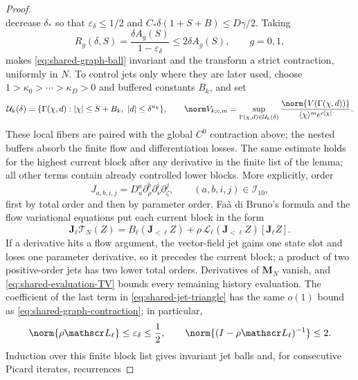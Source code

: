 \begin{proof}
\[\]
decrease \(\delta_*\) so that \(\varepsilon_\delta\le1/2\) and
\(C_*\delta(1+S+B)\le D\gamma/2\).  Taking
\begin{equation}
 R_g(\delta,S)=\frac{\delta A_g(S)}{1-\varepsilon_\delta}
               \le2\delta A_g(S),\qquad g=0,1,       \label{eq:shared-graph-radii}
\end{equation}
makes \cref{eq:shared-graph-ball} invariant and the transform a strict
contraction, uniformly in \(N\).
To control jets only where they are later used, choose
\(1>\kappa_0>\cdots>\kappa_D>0\) and buffered constants \(B_k\), and set
\[
 \mathcal U_k(\delta)
 =\{\Gamma(\chi,d):|\chi|\le S+B_k,\ |d|\le\delta^{\kappa_k}\},
 \qquad
 \norm V_{k;c,m}
 =\sup_{\Gamma(\chi,d)\in\mathcal U_k(\delta)}
   \frac{\norm{V(\Gamma(\chi,d))}}
        {\langle\chi\rangle^m e^{c|\chi|}}.
\]
These local fibers are paired with the global \(C^0\) contraction above;
the nested buffers absorb the finite flow and differentiation losses.
The same estimate holds for the highest current block after any derivative
in the finite list of the lemma; all other terms contain already controlled
lower blocks.  More explicitly, order
\[
 J_{a,b,i,j}=D_u^a\partial_\rho^b\partial_\nu^i
                 \partial_\zeta^j,
 \qquad (a,b,i,j)\in\mathcal I_{10},
\]
first by total order and then by parameter order.  Fa\`a di Bruno's formula
and the flow variational equations put each current block in the form
\begin{equation}
 \mathbf J_\ell\mathcal T_N(Z)
 =B_\ell(\mathbf J_{<\ell}Z)
 +\rho\,\mathscr L_\ell(\mathbf J_{<\ell}Z)
          [\mathbf J_\ell Z].                        \label{eq:shared-jet-triangle}
\end{equation}
If a derivative hits a flow argument, the vector-field jet gains one state
slot and loses one parameter derivative, so it precedes the current block;
a product of two positive-order jets has two lower total orders.  Derivatives
of \(\mathbf M_N\) vanish, and
\cref{eq:shared-evaluation-TV} bounds every remaining history evaluation.
The coefficient of the last term in
\cref{eq:shared-jet-triangle} has the same \(o(1)\) bound as
\cref{eq:shared-graph-contraction}; in particular,
\begin{equation}
 \norm{\rho\mathscr L_\ell}\le\varepsilon_\delta\le\frac12,
 \qquad
 \norm{(I-\rho\mathscr L_\ell)^{-1}}\le2.            \label{eq:shared-jet-block-inverse}
\end{equation}
Induction over this finite block list
gives invariant jet balls and, for consecutive Picard iterates, recurrences

\end{proof}

